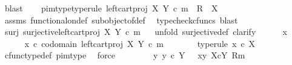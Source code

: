 \begin{isabellebody}
\ blast\isanewline
\ \ \isamarkupfalse%
\ pi{}{\isacharunderscore}{\kern0pt}m{\isacharunderscore}{\kern0pt}type{\isacharbrackleft}{\kern0pt}type{\isacharunderscore}{\kern0pt}rule{\isacharbrackright}{\kern0pt}{\isacharcolon}{\kern0pt}\ {\isachardoublequoteopen}left{\isacharunderscore}{\kern0pt}cart{\isacharunderscore}{\kern0pt}proj\ X\ Y\ {\isasymcirc}\isactrlsub c\ m\ {\isacharcolon}{\kern0pt}\ R\ {\isasymrightarrow}\ X{\isachardoublequoteclose}\isanewline
\ \ \ \ \isamarkupfalse%
\ assms\ functional{\isacharunderscore}{\kern0pt}on{\isacharunderscore}{\kern0pt}def\ subobject{\isacharunderscore}{\kern0pt}of{\isacharunderscore}{\kern0pt}def{}\ \isamarkupfalse%
\ {\isacharparenleft}{\kern0pt}typecheck{\isacharunderscore}{\kern0pt}cfuncs{\isacharcomma}{\kern0pt}\ blast{\isacharparenright}{\kern0pt}\isanewline
\ \ \isamarkupfalse%
\ surj{\isacharcolon}{\kern0pt}\ {\isachardoublequoteopen}surjective{\isacharparenleft}{\kern0pt}left{\isacharunderscore}{\kern0pt}cart{\isacharunderscore}{\kern0pt}proj\ X\ Y\ {\isasymcirc}\isactrlsub c\ m{\isacharparenright}{\kern0pt}{\isachardoublequoteclose}\isanewline
\ \ \isamarkupfalse%
{\isacharparenleft}{\kern0pt}unfold\ surjective{\isacharunderscore}{\kern0pt}def{\isacharcomma}{\kern0pt}\ clarify{\isacharparenright}{\kern0pt}\isanewline
\ \ \ \ \isamarkupfalse%
\ x\ \isanewline
\ \ \ \ \isamarkupfalse%
\ {\isachardoublequoteopen}x\ {\isasymin}\isactrlsub c\ codomain\ {\isacharparenleft}{\kern0pt}left{\isacharunderscore}{\kern0pt}cart{\isacharunderscore}{\kern0pt}proj\ X\ Y\ {\isasymcirc}\isactrlsub c\ m{\isacharparenright}{\kern0pt}{\isachardoublequoteclose}\isanewline
\ \ \ \ \isamarkupfalse%
\ \isamarkupfalse%
\ {\isacharbrackleft}{\kern0pt}type{\isacharunderscore}{\kern0pt}rule{\isacharbrackright}{\kern0pt}{\isacharcolon}{\kern0pt}\ {\isachardoublequoteopen}x\ {\isasymin}\isactrlsub c\ X{\isachardoublequoteclose}\isanewline
\ \ \ \ \ \ \isamarkupfalse%
\ cfunc{\isacharunderscore}{\kern0pt}type{\isacharunderscore}{\kern0pt}def\ pi{}{\isacharunderscore}{\kern0pt}m{\isacharunderscore}{\kern0pt}type\ \isamarkupfalse%
\ force\isanewline
\ \ \ \ \isamarkupfalse%
\ \isamarkupfalse%
\ {\isachardoublequoteopen}{\isasymexists}{\isacharbang}{\kern0pt}\ y{\isachardot}{\kern0pt}\ {\isacharparenleft}{\kern0pt}y\ {\isasymin}\isactrlsub c\ Y\ {\isasymand}\ \ {\isasymlangle}x{\isacharcomma}{\kern0pt}y{\isasymrangle}\ {\isasymin}\isactrlbsub X{\isasymtimes}\isactrlsub cY\isactrlesub \ {\isacharparenleft}{\kern0pt}R{\isacharcomma}{\kern0pt}m{\isacharparenright}{\kern0pt}{\isacharparenright}{\kern0pt}{\isachardoublequoteclose}\isanewline

\end{isabellebody}
